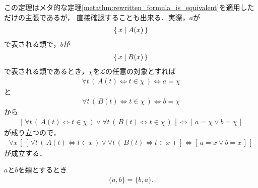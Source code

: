 	この定理はメタ的な定理\ref{metathm:rewritten_formula_is_equivalent}を適用しただけの主張であるが，
	直接確認することも出来る．実際，$a$が
	\begin{align}
		\left\{\, x \mid A(x)\, \right\}
	\end{align}
	で表される類で，$b$が
	\begin{align}
		\left\{\, x \mid B(x)\, \right\}
	\end{align}
	で表される類であるとき，$\chi$を$\mathcal{L}$の任意の対象とすれば
	\begin{align}
		\forall t\, (\, A(t) \Longleftrightarrow t \in \chi\, ) \Longleftrightarrow a = \chi
	\end{align}
	と
	\begin{align}
		\forall t\, (\, B(t) \Longleftrightarrow t \in \chi\, ) \Longleftrightarrow b = \chi
	\end{align}
	から
	\begin{align}
		\left[\, \forall t\, (\, A(t) \Longleftrightarrow t \in \chi\, ) \vee
		\forall t\, (\, B(t) \Longleftrightarrow t \in \chi\, )\, \right]
		\Longleftrightarrow
		\left[\, a = \chi \vee b = \chi\, \right]
	\end{align}
	が成り立つので，
	\begin{align}
		\forall x\, \left[\, \left[\, \forall t\, (\, A(t) \Longleftrightarrow t \in x\, ) \vee
		\forall t\, (\, B(t) \Longleftrightarrow t \in x\, )\, \right]
		\Longleftrightarrow
		\left[\, a = x \vee b = x\, \right]\, \right]
	\end{align}
	が成立する．
	
	\begin{screen}
		\begin{thm}[要素の表示の順番を入れ替えても対は等しい]\label{thm:commutative_law_of_pairs}
			$a$と$b$を類とするとき
			\begin{align}
				\{a,b\} = \{b,a\}.
			\end{align}
		\end{thm}
	\end{screen}
	
